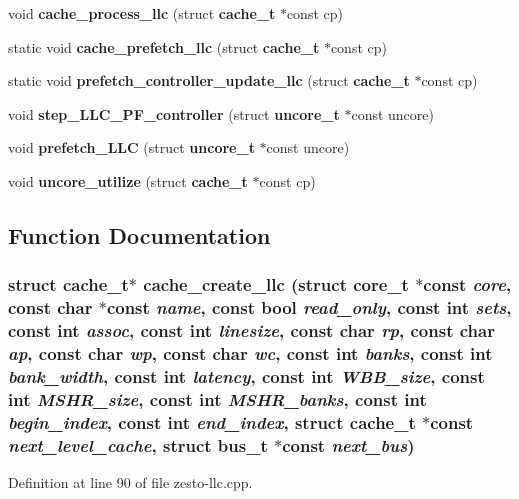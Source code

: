 \begin{CompactItemize}
\item 
void {\bf cache\_\-process\_\-llc} (struct {\bf cache\_\-t} $\ast$const cp)
\item 
static void {\bf cache\_\-prefetch\_\-llc} (struct {\bf cache\_\-t} $\ast$const cp)
\item 
static void {\bf prefetch\_\-controller\_\-update\_\-llc} (struct {\bf cache\_\-t} $\ast$const cp)
\item 
void {\bf step\_\-LLC\_\-PF\_\-controller} (struct {\bf uncore\_\-t} $\ast$const uncore)
\item 
void {\bf prefetch\_\-LLC} (struct {\bf uncore\_\-t} $\ast$const uncore)
\item 
void {\bf uncore\_\-utilize} (struct {\bf cache\_\-t} $\ast$const cp)
\end{CompactItemize}


\subsection{Function Documentation}
\subsubsection[{cache\_\-create\_\-llc}]{\setlength{\rightskip}{0pt plus 5cm}struct {\bf cache\_\-t}$\ast$ cache\_\-create\_\-llc (struct {\bf core\_\-t} $\ast$const  {\em core}, \/  const char $\ast$const  {\em name}, \/  const bool {\em read\_\-only}, \/  const int {\em sets}, \/  const int {\em assoc}, \/  const int {\em linesize}, \/  const char {\em rp}, \/  const char {\em ap}, \/  const char {\em wp}, \/  const char {\em wc}, \/  const int {\em banks}, \/  const int {\em bank\_\-width}, \/  const int {\em latency}, \/  const int {\em WBB\_\-size}, \/  const int {\em MSHR\_\-size}, \/  const int {\em MSHR\_\-banks}, \/  const int {\em begin\_\-index}, \/  const int {\em end\_\-index}, \/  struct {\bf cache\_\-t} $\ast$const  {\em next\_\-level\_\-cache}, \/  struct {\bf bus\_\-t} $\ast$const  {\em next\_\-bus})\hspace{0.3cm}{\tt  [read]}}\label{zesto-llc_8cpp_727c4cbf039edb120fe825803e69067f}




Definition at line 90 of file zesto-llc.cpp.

